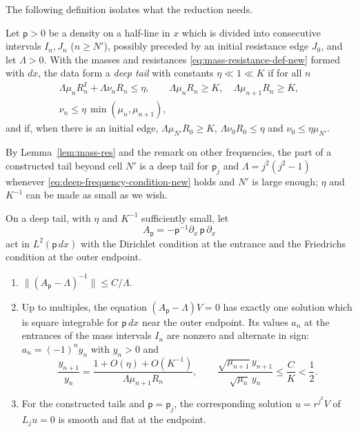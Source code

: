 The following definition isolates what the reduction needs.

\begin{definition}\label{def:deep-tail}
Let $\mathsf p>0$ be a density on a half-line in $x$ which is divided
into consecutive intervals $I_n,J_n$ ($n\ge N'$), possibly preceded by
an initial resistance edge $J_0$, and let $\Lambda>0$. With the masses
and resistances \eqref{eq:mass-resistance-def-new} formed with $dx$,
the data form a \emph{deep tail} with constants $\eta\ll1\ll K$ if for
all $n$
\begin{equation}\label{eq:rad-eq-dg1}
 \begin{gathered}
 \Lambda\mu_nR_n^I+\Lambda\nu_nR_n\le\eta,\qquad
 \Lambda\mu_nR_n\ge K,\quad \Lambda\mu_{n+1}R_n\ge K,\\
 \nu_n\le\eta\,\min(\mu_n,\mu_{n+1}),
 \end{gathered}
\end{equation}
and if, when there is an initial edge,
$\Lambda\mu_{N'}R_0\ge K$, $\Lambda\nu_0R_0\le\eta$ and
$\nu_0\le\eta\mu_{N'}$.
\end{definition}

By Lemma~\ref{lem:mass-res} and the remark on other frequencies, the
part of a constructed tail beyond cell $N'$ is a deep tail for
$\mathsf p_j$ and $\Lambda=j^2(j^2-1)$ whenever
\eqref{eq:deep-frequency-condition-new} holds and $N'$ is large
enough; $\eta$ and $K^{-1}$ can be made as small as we wish.

\begin{lemma}
\label{lem:radial-deep-inverse}
\label{lem:radial-flat-line}
On a deep tail, with $\eta$ and $K^{-1}$ sufficiently small, let
\[
 A_{\mathsf p}=-\mathsf p^{-1}\partial_x\,\mathsf p\,\partial_x
\]
act in $L^2(\mathsf p\,dx)$ with the Dirichlet condition at the
entrance and the Friedrichs condition at the outer endpoint.
\begin{enumerate}
\item $\|(A_{\mathsf p}-\Lambda)^{-1}\|\le C/\Lambda$.
\item Up to multiples, the equation $(A_{\mathsf p}-\Lambda)V=0$ has
 exactly one solution which is square integrable for
 $\mathsf p\,dx$ near the outer endpoint. Its values $a_n$ at the
 entrances of the mass intervals $I_n$ are nonzero and alternate in
 sign: $a_n=(-1)^ny_n$ with $y_n>0$ and
 \begin{equation}\label{eq:rad-eq-dg4}
  \frac{y_{n+1}}{y_n}
  =\frac{1+O(\eta)+O(K^{-1})}{\Lambda\mu_{n+1}R_n},
  \qquad
  \frac{\sqrt{\mu_{n+1}}\,y_{n+1}}{\sqrt{\mu_n}\,y_n}\le\frac CK<\frac12 .
 \end{equation}
\item For the constructed tails and $\mathsf p=\mathsf p_j$, the
 corresponding solution $u=r^{j^2}V$ of $L_ju=0$ is smooth and flat at
 the endpoint.
\end{enumerate}
\end{lemma}

